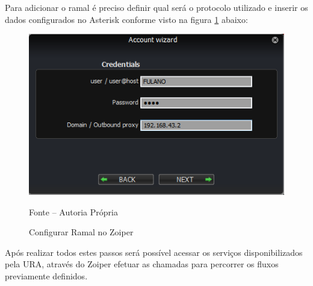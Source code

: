 Para adicionar o ramal é preciso definir qual será o protocolo utilizado e inserir os dados configurados no Asterisk conforme visto na figura \ref{figura:zoiperConfigRamal} abaixo:

\begin{figure}[!htb]
	\centering
	\includegraphics{figuras/configurar_ramal_zoiper.png}
	\caption{Configurar Ramal no Zoiper}
	\label{figura:zoiperConfigRamal}	
	Fonte – Autoria Própria
\end{figure}

Após realizar todos estes passos será possível acessar os serviços disponibilizados pela URA, através do Zoiper efetuar as chamadas para percorrer os fluxos previamente definidos.